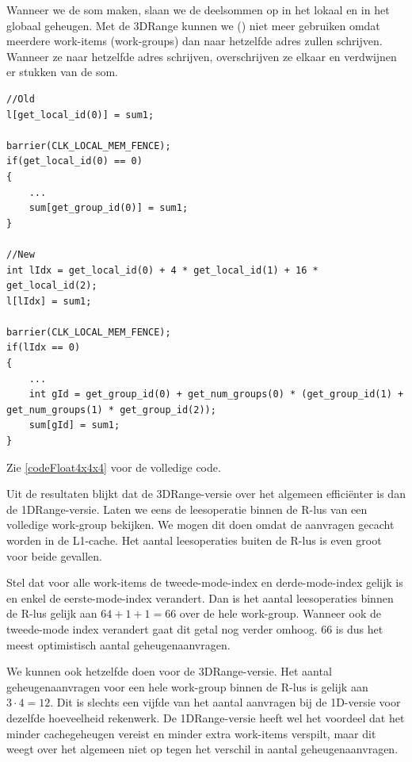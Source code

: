 Wanneer we de som maken, slaan we de deelsommen op in het lokaal en in het globaal geheugen. Met de 3DRange kunnen we () niet meer gebruiken omdat meerdere work-items (work-groups) dan naar hetzelfde adres zullen schrijven. Wanneer ze naar hetzelfde adres schrijven, overschrijven ze elkaar en verdwijnen er stukken van de som.
\begin{lstlisting}
//Old
l[get_local_id(0)] = sum1;
	
barrier(CLK_LOCAL_MEM_FENCE);
if(get_local_id(0) == 0)
{        
	...
	sum[get_group_id(0)] = sum1;
}

//New
int lIdx = get_local_id(0) + 4 * get_local_id(1) + 16 * get_local_id(2);
l[lIdx] = sum1;

barrier(CLK_LOCAL_MEM_FENCE);
if(lIdx == 0)
{        
	...
	int gId = get_group_id(0) + get_num_groups(0) * (get_group_id(1) + get_num_groups(1) * get_group_id(2));
	sum[gId] = sum1;
}
\end{lstlisting}


Zie \ref{codeFloat4x4x4} voor de volledige code.


Uit de resultaten blijkt dat de 3DRange-versie over het algemeen effici\"enter is dan de 1DRange-versie. Laten we eens de leesoperatie binnen de R-lus van een volledige work-group bekijken. We mogen dit doen omdat de aanvragen gecacht worden in de L1-cache. Het aantal leesoperaties buiten de R-lus is even groot voor beide gevallen.

Stel dat voor alle work-items de tweede-mode-index en derde-mode-index gelijk is en enkel de eerste-mode-index verandert. Dan is het aantal leesoperaties binnen de R-lus gelijk aan $64 + 1 + 1 = 66$ over de hele work-group. Wanneer ook de tweede-mode index verandert gaat dit getal nog verder omhoog. 66 is dus het meest optimistisch aantal geheugenaanvragen.

We kunnen ook hetzelfde doen voor de 3DRange-versie. Het aantal geheugenaanvragen voor een hele work-group binnen de R-lus is gelijk aan $3 \cdot 4 = 12$. Dit is slechts een vijfde van het aantal aanvragen bij de 1D-versie voor dezelfde hoeveelheid rekenwerk. De 1DRange-versie heeft wel het voordeel dat het minder cachegeheugen vereist en minder extra work-items verspilt, maar dit weegt over het algemeen niet op tegen het verschil in aantal geheugenaanvragen.

